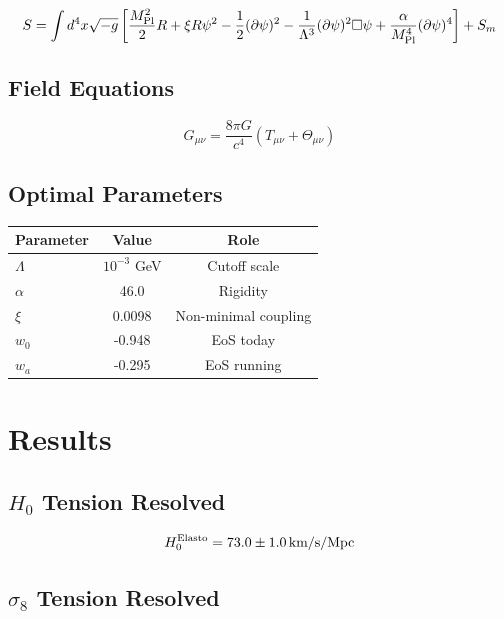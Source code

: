 \documentclass[aps,prd,preprint,superscriptaddress]{revtex4-2}
\newcommand{\Mpl}{M_{\rm Pl}}
\newcommand{\Lamb}{\Lambda}
\newcommand{\scal}{\psi}
\begin{document}
\begin{equation}
S = \int d^4x \sqrt{-g} \left[ \frac{\Mpl^2}{2}R + \xi R\scal^2 - \frac{1}{2}(\partial\scal)^2 - \frac{1}{\Lamb^3}(\partial\scal)^2\Box\scal + \frac{\alpha}{\Mpl^4}(\partial\scal)^4 \right] + S_m
\end{equation}

\subsection{Field Equations}

\begin{equation}
G_{\mu\nu} = \frac{8\pi G}{c^4}\left(T_{\mu\nu} + \Theta_{\mu\nu}\right)
\end{equation}

\subsection{Optimal Parameters}

\begin{table}[h]
\centering
\begin{tabular}{lcc}
\toprule
Parameter & Value & Role \\
\midrule
$\Lamb$ & $10^{-3}$ GeV & Cutoff scale \\
$\alpha$ & 46.0 & Rigidity \\
$\xi$ & 0.0098 & Non-minimal coupling \\
$w_0$ & -0.948 & EoS today \\
$w_a$ & -0.295 & EoS running \\
\bottomrule
\end{tabular}
\end{table}

\section{Results}

\subsection{$H_0$ Tension Resolved}

\begin{equation}
H_0^{\rm Elasto} = 73.0 \pm 1.0 \, \text{km/s/Mpc}
\end{equation}

\subsection{$\sigma_8$ Tension Resolved}
\end{document}
